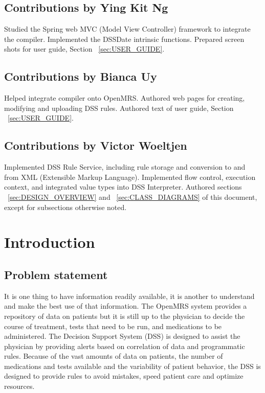 \documentclass[12pt,letterpaper]{article}
\begin{document}
\subsection{Contributions by Ying Kit Ng}
Studied the Spring web MVC (Model View Controller) framework to integrate 
the compiler. Implemented the DSSDate intrinsic functions. Prepared screen 
shots for user guide, Section ~\ref{sec:USER_GUIDE}.

\subsection{Contributions by Bianca Uy}
Helped integrate compiler onto OpenMRS.
Authored web pages for creating, modifying and uploading DSS rules.
Authored text of user guide, Section ~\ref{sec:USER_GUIDE}.

\subsection{Contributions by Victor Woeltjen}
Implemented DSS Rule Service, including rule storage and conversion to and from XML (Extensible Markup Language). Implemented flow control, execution 
context, and integrated value types into DSS Interpreter. Authored sections 
~\ref{sec:DESIGN_OVERVIEW} and
~\ref{sec:CLASS_DIAGRAMS} of this document, except for subsections otherwise noted.


\newpage 
\section{Introduction} \label{sec:INTRODUCTION}

\subsection{Problem statement}

It is one thing to have information readily available, it is another to understand and make the best use of that information.  The OpenMRS system provides a repository of data on patients but it is still up to the physician to decide the course of treatment, tests that need to be run, and medications to be administered.  The Decision Support System (DSS) is designed to assist the physician by providing alerts based on correlation of data and programmatic rules.  Because of the vast amounts of data on patients, the number of medications and tests available and the variability of patient behavior, the DSS is designed to provide rules to avoid mistakes, speed patient care and optimize resources.
\end{document}
